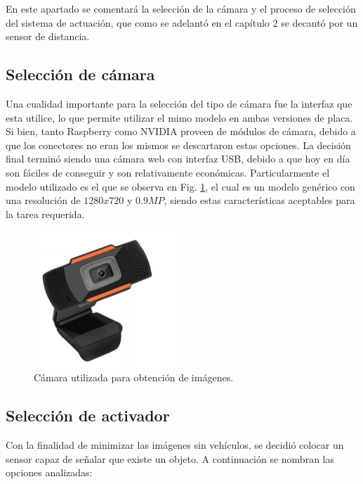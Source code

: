 En este apartado se comentará la selección de la cámara y el proceso de selección del sistema de actuación, que como se adelantó en el capítulo 2 se decantó por un sensor de distancia.

\subsection{Selección de cámara}

Una cualidad importante para la selección del tipo de cámara fue la interfaz que esta utilice, lo que permite utilizar el mimo modelo en ambas versiones de placa. Si bien, tanto Raspberry como NVIDIA proveen de módulos de cámara, debido a que los conectores no eran los mismos se descartaron estas opciones. La decisión final terminó siendo una cámara web con interfaz USB, debido a que hoy en día son fáciles de conseguir y son relativamente económicas. Particularmente el modelo utilizado es el que se observa en Fig. \ref{fig:camara-usb}, el cual es un modelo genérico con una resolución de $1280x720$ y $0.9MP$, siendo estas características aceptables para la tarea requerida.

\begin{figure}
    \centering
    \includegraphics[width=0.5\textwidth]{imgs/camara-usb.jpg}
    \caption{Cámara utilizada para obtención de imágenes.}
    \label{fig:camara-usb}
\end{figure}

\subsection{Selección de activador}

Con la finalidad de minimizar las imágenes sin vehículos, se decidió colocar un sensor capaz de señalar que existe un objeto. A continuación se nombran las opciones analizadas:

